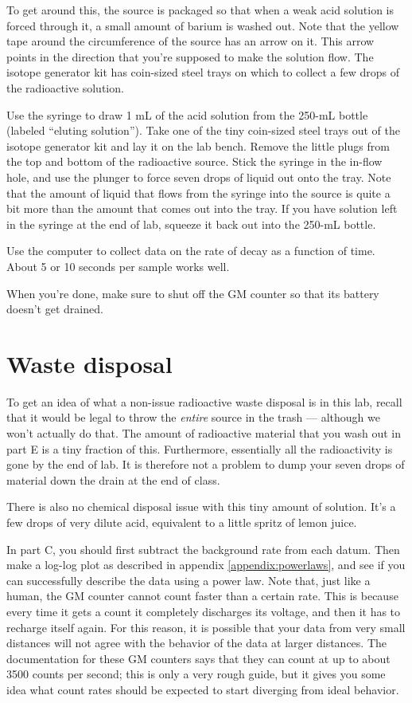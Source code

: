 
To get around this, the source is packaged so that when a weak acid solution is forced through
it, a small amount of barium is washed out. Note that the yellow tape around the circumference
of the source has an arrow on it. This arrow points in the direction that you're supposed
to make the solution flow. The isotope generator kit has coin-sized steel trays on which to
collect a few drops of the radioactive solution.

Use the syringe to draw 1 mL of the acid solution from the 250-mL bottle (labeled ``eluting solution'').
Take one of the tiny coin-sized steel trays out of the isotope generator kit and lay it on the lab bench.
Remove the little plugs from the top and bottom of the radioactive source. Stick the syringe in the
in-flow hole, and use the plunger to force seven drops of liquid out onto the tray. Note that
the amount of liquid that flows from the syringe into the source is quite a bit more than the
amount that comes out into the tray. If you have solution left in the syringe at the end of lab,
squeeze it back out into the 250-mL bottle.

Use the computer to collect data on the rate of decay as a function of time. About 5 or 10 seconds
per sample works well.

When you're done, make sure to shut off the GM counter so that its battery doesn't get drained.

\section*{Waste disposal}

To get an idea of what a non-issue  radioactive waste disposal is in this lab,
recall that it would be legal to throw the \emph{entire} source in the trash --- although we won't
actually do that.
The amount of radioactive material that you wash out in part E is a tiny fraction of this.
Furthermore, essentially all the radioactivity is
gone by the end of lab. It is therefore not a problem to dump your seven drops of material
down the drain at the end of class.

There is also no chemical disposal issue with this tiny amount of solution.
It's a few drops of very dilute acid, equivalent to a little spritz of lemon juice.

\analysis

In part C, you should first subtract the background
rate from each datum. Then make a log-log plot as described in appendix \ref{appendix:powerlaws},
and see if you can successfully describe the data using a power law.
Note that, just like a human, the GM counter cannot count faster than a certain rate.
This is because every time it gets a count it completely discharges its voltage, and
then it has to recharge itself again. For this reason, it is possible that your data
from very small distances will not agree with the behavior of the data at larger distances.
The documentation for these GM counters says that they can count at up to about
3500 counts per second; this is only a very rough guide, but it gives you some idea what
count rates should be expected to start diverging from ideal behavior.

